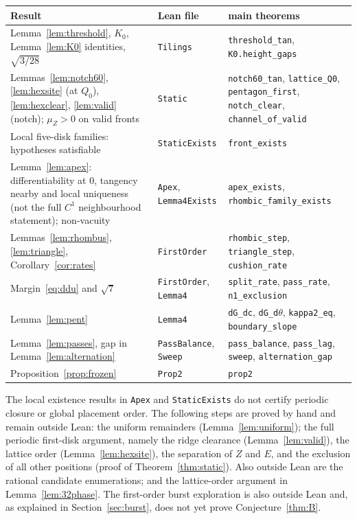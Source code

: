 \documentclass[11pt]{amsart}
\theoremstyle{definition}
\newcommand{\lean}[1]{\texttt{#1}}
\begin{document}
\begin{center}\small
\begin{tabular}{@{}>{\raggedright\arraybackslash}p{}>{\raggedright\arraybackslash}p{}>{\raggedright\arraybackslash}p{}@{}}
\toprule
Result & Lean file & main theorems\\
\midrule
Lemma~\ref{lem:threshold}, $K_0$, Lemma~\ref{lem:K0} identities, $\sqrt{3/28}$ & \lean{Tilings} & \lean{threshold\_tan}, \lean{K0.height\_gaps}\\
Lemmas~\ref{lem:notch60}, \ref{lem:hexsite} (at $Q_0$), \ref{lem:hexclear}, \ref{lem:valid} (notch); $\mu_Z>0$ on valid fronts & \lean{Static} & \lean{notch60\_tan}, \lean{lattice\_Q0}, \lean{pentagon\_first}, \lean{notch\_clear}, \lean{channel\_of\_valid}\\
Local five-disk families: hypotheses satisfiable & \lean{StaticExists} & \lean{front\_exists}\\
Lemma~\ref{lem:apex}: differentiability at $0$, tangency nearby and local uniqueness (not the full $C^1$ neighbourhood statement); non-vacuity & \lean{Apex}, \lean{Lemma4Exists} & \lean{apex\_exists}, \lean{rhombic\_family\_exists}\\
Lemmas~\ref{lem:rhombus}, \ref{lem:triangle}, Corollary~\ref{cor:rates} & \lean{FirstOrder} & \lean{rhombic\_step}, \lean{triangle\_step}, \lean{cushion\_rate}\\
Margin~\eqref{eq:ddu} and $\sqrt7$ & \lean{FirstOrder}, \lean{Lemma4} & \lean{split\_rate}, \lean{pass\_rate}, \lean{n1\_exclusion}\\
Lemma~\ref{lem:pent} & \lean{Lemma4} & \lean{dG\_dc}, \lean{dG\_d$\theta$}, \lean{kappa2\_eq}, \lean{boundary\_slope}\\
Lemma~\ref{lem:passes}, gap in Lemma~\ref{lem:alternation} & \lean{PassBalance}, \lean{Sweep} & \lean{pass\_balance}, \lean{pass\_lag}, \lean{sweep}, \lean{alternation\_gap}\\
Proposition~\ref{prop:frozen} & \lean{Prop2} & \lean{prop2}\\
\bottomrule
\end{tabular}
\end{center}

The local existence results in \lean{Apex} and \lean{StaticExists} do not certify periodic
closure or global placement order. The following steps are proved by hand and remain outside
Lean: the uniform remainders (Lemma~\ref{lem:uniform}); the full periodic first-disk argument,
namely the ridge clearance (Lemma~\ref{lem:valid}), the lattice order (Lemma~\ref{lem:hexsite}), the
separation of $Z$ and $E$, and the exclusion of all other positions (proof of
Theorem~\ref{thm:static}). Also outside Lean are the rational candidate enumerations; and the lattice-order argument in
Lemma~\ref{lem:32phase}. The first-order burst exploration is also outside Lean and, as
explained in Section~\ref{sec:burst}, does not yet prove Conjecture~\ref{thm:B}.
\end{document}
